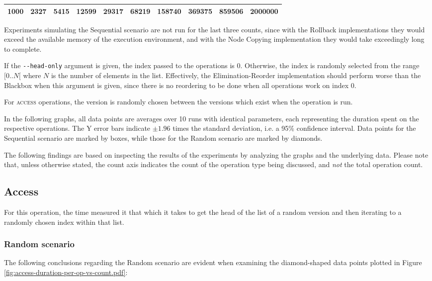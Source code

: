\begin{tabular}{|l|l|l|l|l|l|l|l|l|l|}
\hline
1000 & 2327 & 5415 & 12599 & 29317 & 68219 & 158740 & 369375 & 859506 & 2000000\\
\hline
\end{tabular}

Experiments simulating the Sequential scenario are not run for the last three
counts, since with the Rollback implementations they would exceed the available
memory of the execution environment, and with the Node Copying implementation
they would take exceedingly long to complete.

If the \texttt{-\@{}-head-only} argument is given, the index passed to the
operations is 0. Otherwise, the index is randomly selected from the range
$[0..N[$ where $N$ is the number of elements in the list. Effectively, the
Elimination-Reorder implementation should perform worse than the Blackbox when
this argument is given, since there is no reordering to be done when all
operations work on index 0.

For \textsc{access} operations, the version is randomly chosen between the
versions which exist when the operation is run.

In the following graphs, all data points are averages over 10 runs with
identical parameters, each representing the duration spent on the respective
operations. The Y error bars indicate $\pm 1.96$ times the standard deviation,
i.e. a 95\% confidence interval. Data points for the Sequential scenario are
marked by boxes, while those for the Random scenario are marked by diamonds.

The following findings are based on inspecting the results of the experiments by
analyzing the graphs and the underlying data. Please note that, unless otherwise
stated, the count axis indicates the count of the operation type being
discussed, and \emph{not} the total operation count.

\subsection{Access}
For this operation, the time measured it that which it takes to get the head of
the list of a random version and then iterating to a randomly chosen index
within that list.

\subsubsection{Random scenario}
The following conclusions regarding the Random scenario are evident when
examining the diamond-shaped data points plotted in Figure
\ref{fig:access-duration-per-op-vs-count.pdf}:


